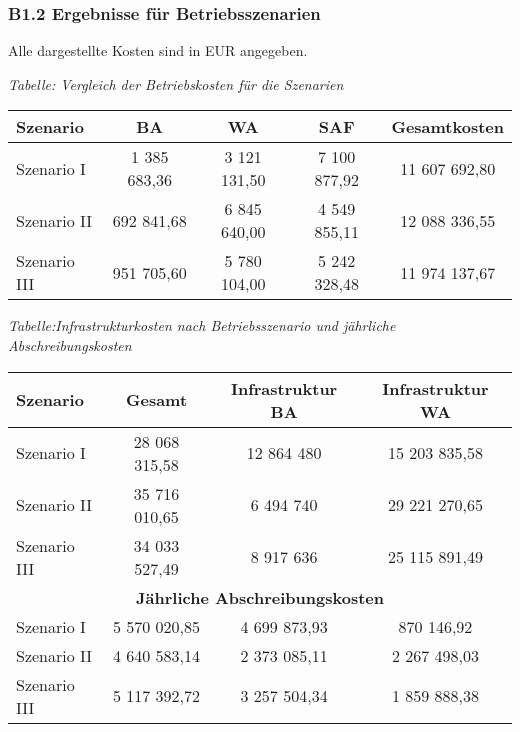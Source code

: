 \subsubsection{B1.2 Ergebnisse für Betriebsszenarien}
Alle dargestellte Kosten sind in EUR angegeben.
\begin{table}[h]
    {\small \textit{Tabelle: Vergleich der Betriebskosten für die Szenarien}}
    \centering
    \begin{tabular}{lcccc}
        \toprule
        \textbf{Szenario} & \textbf{BA} & \textbf{WA} & \textbf{SAF} & \textbf{Gesamtkosten} \\
        \midrule
        Szenario I   & 1 385 683,36  & 3 121 131,50  & 7 100 877,92  & 11 607 692,80 \\
        Szenario II  & 692 841,68    & 6 845 640,00  & 4 549 855,11  & 12 088 336,55 \\
        Szenario III & 951 705,60    & 5 780 104,00  & 5 242 328,48  & 11 974 137,67 \\
        \bottomrule
    \end{tabular}
    \label{tab:betriebsszenarien}
\end{table}

\begin{table}[h]
    {\small \textit{Tabelle:Infrastrukturkosten nach Betriebsszenario und jährliche Abschreibungskosten}}
    \centering
    \begin{tabular}{lccc}
        \toprule
        \textbf{Szenario} & \textbf{Gesamt} & \textbf{Infrastruktur BA} & \textbf{Infrastruktur WA} \\
        \midrule
        Szenario I   & 28 068 315,58 & 12 864 480  & 15 203 835,58 \\
        Szenario II  & 35 716 010,65 & 6 494 740   & 29 221 270,65 \\
        Szenario III & 34 033 527,49 & 8 917 636   & 25 115 891,49 \\
        \midrule
        \multicolumn{4}{c}{\textbf{Jährliche Abschreibungskosten}} \\
        \midrule
        Szenario I   & 5 570 020,85  & 4 699 873,93  & 870 146,92  \\
        Szenario II  & 4 640 583,14  & 2 373 085,11  & 2 267 498,03 \\
        Szenario III & 5 117 392,72  & 3 257 504,34  & 1 859 888,38 \\
        \bottomrule
    \end{tabular}
    \label{tab:szenario_analyse}
\end{table}